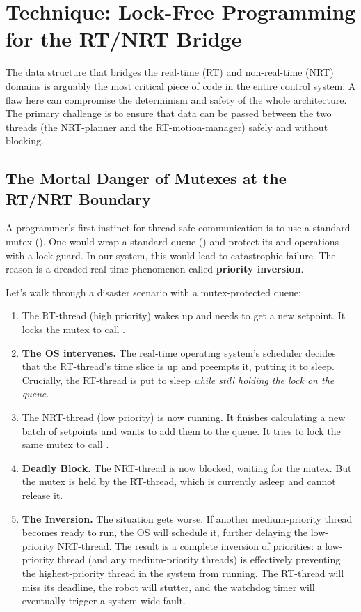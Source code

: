 
\section{Technique: Lock-Free Programming for the RT/NRT Bridge}
\label{sec:technique_lock_free}

The data structure that bridges the real-time (RT) and non-real-time (NRT) domains is arguably the most critical piece of code in the entire control system. A flaw here can compromise the determinism and safety of the whole architecture. The primary challenge is to ensure that data can be passed between the two threads (the NRT-planner and the RT-motion-manager) safely and without blocking.

\subsection{The Mortal Danger of Mutexes at the RT/NRT Boundary}
\label{subsec:mutex_danger}

A programmer's first instinct for thread-safe communication is to use a standard mutex (). One would wrap a standard queue () and protect its  and  operations with a lock guard. In our system, this would lead to catastrophic failure. The reason is a dreaded real-time phenomenon called \textbf{priority inversion}.

Let's walk through a disaster scenario with a mutex-protected queue:
\begin{enumerate}
    \item The RT-thread (high priority) wakes up and needs to get a new setpoint. It locks the mutex to call .
    \item \textbf{The OS intervenes.} The real-time operating system's scheduler decides that the RT-thread's time slice is up and preempts it, putting it to sleep. Crucially, the RT-thread is put to sleep \textit{while still holding the lock on the queue}.
    \item The NRT-thread (low priority) is now running. It finishes calculating a new batch of setpoints and wants to add them to the queue. It tries to lock the same mutex to call .
    \item \textbf{Deadly Block.} The NRT-thread is now blocked, waiting for the mutex. But the mutex is held by the RT-thread, which is currently asleep and cannot release it.
    \item \textbf{The Inversion.} The situation gets worse. If another medium-priority thread becomes ready to run, the OS will schedule it, further delaying the low-priority NRT-thread. The result is a complete inversion of priorities: a low-priority thread (and any medium-priority threads) is effectively preventing the highest-priority thread in the system from running. The RT-thread will miss its deadline, the robot will stutter, and the watchdog timer will eventually trigger a system-wide fault.
\end{enumerate}

